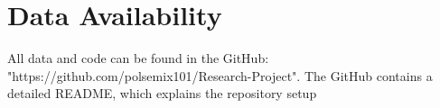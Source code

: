 \chapter{Data Availability}
All data and code can be found in the GitHub: "https://github.com/polsemix101/Research-Project". The GitHub contains a detailed README, which explains the repository setup
